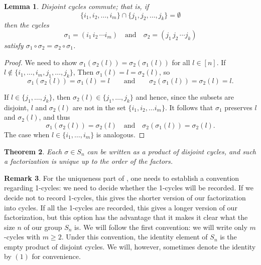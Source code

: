 \documentclass[12pt]{report}
\newtheorem{theorem}{Theorem}[chapter]
\newtheorem{lemma}[theorem]{Lemma}
\numberwithin{equation}{section}
\numberwithin{theorem}{chapter}
\theoremstyle{definition}
\newtheorem*{basic properties}{Basic Properties}
\newtheorem*{Important Remark}{Important Remark}
\newtheorem{remark}[theorem]{Remark}
\newcommand{\s}{\sigma}
\begin{document}
\begin{lemma}\label{disjoint cycles commute}
Disjoint cycles commute; that is, if
$$\{i_1 , i_2 , \dots, i_m\} \cap \{j_1 , j_2 , \dots, j_k\}=\emptyset$$
then the cycles
$$\sigma_1=(i_1 \, i_2 \, \cdots i_m) \quad \textrm{and} \quad \sigma_2=(j_1 \, j_2 \, \cdots j_k)$$
satisfy $\sigma_1 \circ \sigma_2=\sigma_2\circ \sigma_1$.
\end{lemma}


\begin{proof}
We need to show $\sigma_1(\sigma_2(l)) = \sigma_2(\s_1(l))$ for all $l \in [n]$. If $l \notin \{i_1, \ldots, i_m, j_1, \dots, j_k\}$, Then $\s_1(l) = l = \s_2(l)$, so 
$$\s_1(\s_2(l)) = \s_1(l) = l \qquad \textrm{and} \qquad \s_2(\s_1(l)) = \s_2(l) = l.$$



If $l \in \{j_1, \dots, j_k\}$, then $\sigma_2(l) \in \{j_1, \dots, j_k\}$ and hence, since the subsets are disjoint, $l$ and $\sigma_2(l)$ are not in the set $\{i_1 , i_2 , \dots i_m\}$. It follows that $\sigma_1$ preserves $l$ and $\s_2(l)$, and thus
  $$\sigma_1(\sigma_2(l)) = \sigma_2(l) \quad \textrm{and} \quad \sigma_2(\sigma_1(l)) = \sigma_2(l).$$
  The case when $l \in \{i_1, \dots, i_m\}$ is analogous.
\end{proof}








\begin{theorem}\label{every permutation is a product of disjoint cycles}
	Each $\sigma \in S_n$ can be written as a product of disjoint cycles, and such a factorization is unique up to the order of the factors.
\end{theorem}


\begin{remark}
For the uniqueness part of , one needs to establish a convention regarding 1-cycles: we need to decide whether the 1-cycles will be recorded. If we decide not to record $1$-cycles, this gives the shorter version of our factorization into cycles. If all the 1-cycles are recorded, this gives a longer version of our factorization, but this option has the advantage that it makes it clear what the size $n$ of our group $S_n$ is. We will follow the first convention: we will write only $m$-cycles with $m \geqslant 2$. Under this convention, the identity element of $S_n$ is the empty product of disjoint cycles. We will, however, sometimes denote the identity by $(1)$ for convenience.
\end{remark}
\end{document}
